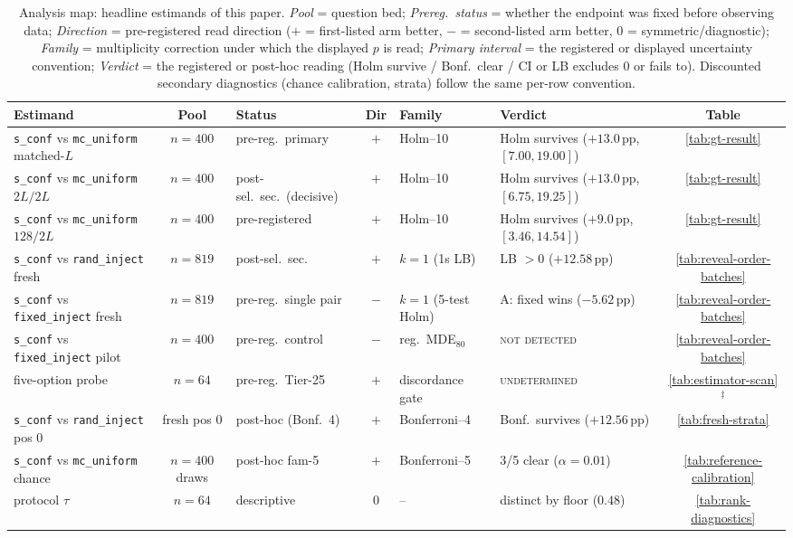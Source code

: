 \documentclass{article}
\newcommand{\sconf}{\texttt{s\_conf}}
\newcommand{\rinj}{\texttt{rand\_inject}}
\newcommand{\finj}{\texttt{fixed\_inject}}
\newcommand{\mcu}{\texttt{mc\_uniform}}
\newcommand{\pp}{\,\mathrm{pp}}
\begin{document}
\begin{table}[t]
\centering
\footnotesize
\setlength{\tabcolsep}{2.4pt}
\caption{Analysis map: headline estimands of this paper.
\emph{Pool} = question bed; \emph{Prereg.\ status} = whether the endpoint
was fixed before observing data;
\emph{Direction} = pre-registered read direction ($+$ = first-listed arm
better, $-$ = second-listed arm better, $0$ = symmetric/diagnostic);
\emph{Family} = multiplicity correction under which the displayed $p$ is
read; \emph{Primary interval} = the registered or displayed uncertainty
convention; \emph{Verdict} = the registered or post-hoc reading
(Holm survive / Bonf.\ clear / CI or LB excludes $0$ or fails to).
Discounted secondary diagnostics (chance calibration, strata) follow the
same per-row convention.}
\label{tab:analysis-map}
\begin{tabular}{@{}p{} c p{} c p{} p{} c @{}}
\toprule
Estimand & Pool & Status & Dir & Family & Verdict & Table \\
\midrule
\sconf{} vs \mcu{} matched-$L$ & $n{=}400$ & pre-reg.\ primary & $+$ & Holm--10 & Holm survives ($+13.0\pp$, $[7.00,19.00]$) & \ref{tab:gt-result} \\
\sconf{} vs \mcu{} $2L/2L$ & $n{=}400$ & post-sel.\ sec.\ (decisive) & $+$ & Holm--10 & Holm survives ($+13.0\pp$, $[6.75,19.25]$) & \ref{tab:gt-result} \\
\sconf{} vs \mcu{} $128/2L$ & $n{=}400$ & pre-registered & $+$ & Holm--10 & Holm survives ($+9.0\pp$, $[3.46,14.54]$) & \ref{tab:gt-result} \\
\sconf{} vs \rinj{} fresh & $n{=}819$ & post-sel.\ sec.\ & $+$ & $k{=}1$ (1s LB) & LB ${>}0$ ($+12.58\pp$) & \ref{tab:reveal-order-batches} \\
\sconf{} vs \finj{} fresh & $n{=}819$ & pre-reg.\ single pair & $-$ & $k{=}1$ (5-test Holm) & A: fixed wins ($-5.62\pp$) & \ref{tab:reveal-order-batches} \\
\sconf{} vs \finj{} pilot & $n{=}400$ & pre-reg.\ control & $-$ & reg.\ MDE$_{80}$ & \textsc{not detected} & \ref{tab:reveal-order-batches} \\
five-option probe & $n{=}64$ & pre-reg.\ Tier-25 & $+$ & discordance gate & \textsc{undetermined} & \ref{tab:estimator-scan}$^{\ddagger}$ \\
\sconf{} vs \rinj{} pos $0$ & fresh pos $0$ & post-hoc (Bonf.\ 4) & $+$ & Bonferroni--4 & Bonf.\ survives ($+12.56\pp$) & \ref{tab:fresh-strata} \\
\sconf{} vs \mcu{} chance & $n{=}400$ draws & post-hoc fam-5 & $+$ & Bonferroni--5 & 3/5 clear ($\alpha{=}0.01$) & \ref{tab:reference-calibration} \\
protocol $\tau$ & $n{=}64$ & descriptive & $0$ & -- & distinct by floor ($0.48$) & \ref{tab:rank-diagnostics} \\
\bottomrule
\end{tabular}
\vspace{2pt}


\end{table}
\end{document}
